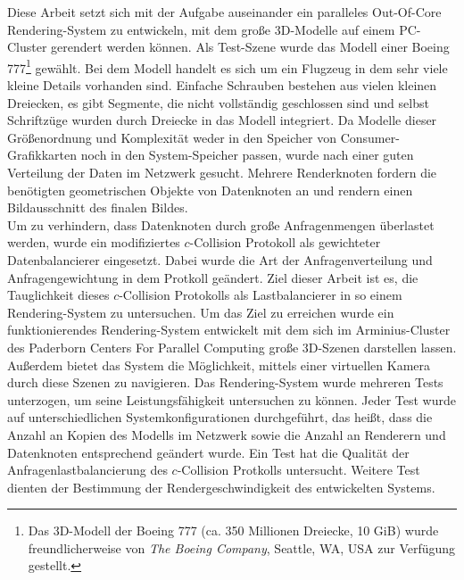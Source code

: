 Diese Arbeit setzt sich mit der Aufgabe auseinander ein paralleles Out-Of-Core Rendering-System zu entwickeln, mit dem große 3D-Modelle auf einem PC-Cluster gerendert werden können. Als Test-Szene wurde das Modell einer Boeing 777\footnote{Das 3D-Modell der Boeing 777 (ca. 350 Millionen Dreiecke, 10 GiB) wurde freundlicherweise von \textit{The Boeing Company}, Seattle, WA, USA zur Verfügung gestellt.} gewählt. Bei dem Modell handelt es sich um ein Flugzeug in dem sehr viele kleine Details vorhanden sind. Einfache Schrauben bestehen aus vielen kleinen Dreiecken, es gibt Segmente, die nicht vollständig geschlossen sind und selbst Schriftzüge wurden durch Dreiecke in das Modell integriert. Da Modelle dieser Größenordnung und Komplexität weder in den Speicher von Consumer-Grafikkarten noch in den System-Speicher passen, wurde nach einer guten Verteilung der Daten im Netzwerk gesucht. Mehrere Renderknoten fordern die benötigten geometrischen Objekte von Datenknoten an und rendern einen Bildausschnitt des finalen Bildes.\\
Um zu verhindern, dass Datenknoten durch große Anfragenmengen überlastet werden, wurde ein modifiziertes $c$-Collision Protokoll als gewichteter Datenbalancierer eingesetzt. Dabei wurde die Art der Anfragenverteilung und Anfragengewichtung in dem Protkoll geändert. Ziel dieser Arbeit ist es, die Tauglichkeit dieses $c$-Collision Protokolls als Lastbalancierer in so einem Rendering-System zu untersuchen. Um das Ziel zu erreichen wurde ein funktionierendes Rendering-System entwickelt mit dem sich im Arminius-Cluster des Paderborn Centers For Parallel Computing große 3D-Szenen darstellen lassen. Außerdem bietet das System die Möglichkeit, mittels einer virtuellen Kamera durch diese Szenen zu navigieren. Das Rendering-System wurde mehreren Tests unterzogen, um seine Leistungsfähigkeit untersuchen zu können. Jeder Test wurde auf unterschiedlichen Systemkonfigurationen durchgeführt, das heißt, dass die Anzahl an Kopien des Modells im Netzwerk sowie die Anzahl an Renderern und Datenknoten entsprechend geändert wurde. Ein Test hat die Qualität der Anfragenlastbalancierung des $c$-Collision Protkolls untersucht. Weitere Test dienten der Bestimmung der Rendergeschwindigkeit des entwickelten Systems.


%
%
